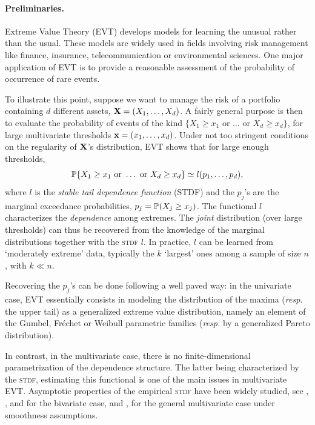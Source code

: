 \paragraph{Preliminaries.}
Extreme Value Theory (\textsc{EVT}) develops models for learning the unusual rather than the usual. These models are widely used in fields involving risk management like finance, insurance, telecommunication or environmental sciences. One major application of \textsc{EVT} is to provide a reasonable assessment of the probability of occurrence of rare events. 

To illustrate this point, suppose we want to manage the risk of a portfolio containing $d$ different assets, $\mb X = (X_1,\ldots,X_d)$. A fairly general purpose is then to evaluate the probability of events of the kind $\{X_1 \ge x_1 \text{ or }  \dotsc \text{ or } X_d\ge x_d \}$, for large multivariate thresholds $\mb x=(x_1,\ldots,x_d)$. Under not too stringent conditions on the regularity of $\mb X$'s  distribution, \textsc{EVT} shows that for large enough thresholds, 
\[
\P\{X_1 \ge x_1 \text{ or }  \dotsc \text{ or }
X_d\ge x_d \} \simeq 
l(p_1,\ldots,p_d), 
\]  
where $l$ is the  \emph{stable tail dependence function} (STDF) and the $p_j$'s  are the marginal exceedance probabilities, $p_j = \P(X_j\ge x_j)$. The functional $l$ characterizes the \emph{dependence} among extremes. The \emph{joint} distribution (over large thresholds) can thus be recovered from the knowledge of the marginal distributions  together with the \textsc{stdf} $l$. In practice, $l$ can be learned from `moderately extreme' data, typically the $k$ `largest' ones among a sample of size $n$, with $k\ll n$.

Recovering the $p_j$'s can be done following a well paved way: in the univariate case, \textsc{EVT} essentially consists in modeling the distribution of the maxima (\emph{resp.} the upper tail) as a generalized extreme value distribution, namely an element of the Gumbel, Fréchet or Weibull parametric families (\emph{resp.} by a generalized Pareto distribution).

In contrast, in the multivariate case, there is no finite-dimensional parametrization of the dependence structure. 
The latter being characterized by the \textsc{stdf}, estimating this functional is one of the main issues in multivariate \textsc{EVT}. Asymptotic properties of the empirical \textsc{stdf} have been widely studied, see \cite{Huangphd}, \cite{Drees98}, \cite{Embrechts2000} and \cite{dHF06} for the bivariate case, and \cite{Qi97}, \cite{Einmahl2012} for the general multivariate case under smoothness assumptions.

